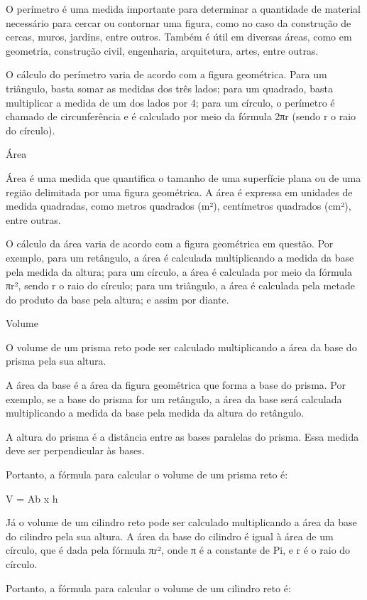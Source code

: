 O perímetro é uma medida importante para determinar a quantidade de
material necessário para cercar ou contornar uma figura, como no caso da
construção de cercas, muros, jardins, entre outros. Também é útil em
diversas áreas, como em geometria, construção civil, engenharia,
arquitetura, artes, entre outras.

O cálculo do perímetro varia de acordo com a figura geométrica. Para um
triângulo, basta somar as medidas dos três lados; para um quadrado,
basta multiplicar a medida de um dos lados por 4; para um círculo, o
perímetro é chamado de circunferência e é calculado por meio da fórmula
2πr (sendo r o raio do círculo).

Área

Área é uma medida que quantifica o tamanho de uma superfície plana ou de
uma região delimitada por uma figura geométrica. A área é expressa em
unidades de medida quadradas, como metros quadrados (m²), centímetros
quadrados (cm²), entre outras.

O cálculo da área varia de acordo com a figura geométrica em questão.
Por exemplo, para um retângulo, a área é calculada multiplicando a
medida da base pela medida da altura; para um círculo, a área é
calculada por meio da fórmula πr², sendo r o raio do círculo; para um
triângulo, a área é calculada pela metade do produto da base pela
altura; e assim por diante.

Volume

O volume de um prisma reto pode ser calculado multiplicando a área da
base do prisma pela sua altura.

A área da base é a área da figura geométrica que forma a base do prisma.
Por exemplo, se a base do prisma for um retângulo, a área da base será
calculada multiplicando a medida da base pela medida da altura do
retângulo.

A altura do prisma é a distância entre as bases paralelas do prisma.
Essa medida deve ser perpendicular às bases.

Portanto, a fórmula para calcular o volume de um prisma reto é:

V = Ab x h

Já o volume de um cilindro reto pode ser calculado multiplicando a área
da base do cilindro pela sua altura. A área da base do cilindro é igual
à área de um círculo, que é dada pela fórmula πr², onde π é a constante
de Pi, e r é o raio do círculo.

Portanto, a fórmula para calcular o volume de um cilindro reto é:

